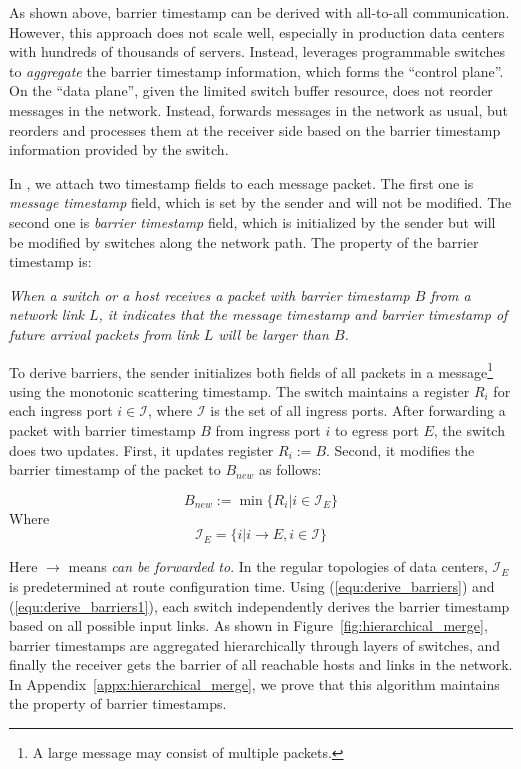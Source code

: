 As shown above, barrier timestamp can be derived with all-to-all communication.
However, this approach does not scale well, especially in production data centers with hundreds of thousands of servers.
Instead, \sys leverages programmable switches to \emph{aggregate} the barrier timestamp information, which forms the ``control plane''.
On the ``data plane'', given the limited switch buffer resource, \sys does not reorder messages in the network.
Instead, \sys forwards messages in the network as usual, but reorders and processes them at the receiver side based on the barrier timestamp information provided by the switch.

In \sys, we attach two timestamp fields to each message packet.
The first one is \textit{message timestamp} field, which is set by the sender and will not be modified. The second one is \textit{barrier timestamp} field, which is initialized by the sender but will be modified by switches along the network path. The property of the barrier timestamp is:

\emph{When a switch or a host receives a packet with barrier timestamp $B$ from a network link $L$, it indicates that the message timestamp and barrier timestamp of future arrival packets from link $L$ will be larger than $B$.}

To derive barriers, the sender initializes both fields of all packets in a message\footnote{A large message may consist of multiple packets.} using the monotonic scattering timestamp. The switch maintains a register $R_i$ for each ingress port $i \in \mathcal{I}$, where $\mathcal{I}$ is the set of all ingress ports.
After forwarding a packet with barrier timestamp $B$ from ingress port $i$ to egress port $E$, the switch does two updates. First, it updates register $R_i := B$. Second, it modifies the barrier timestamp of the packet to $B_{new}$ as follows:

\begin{equation}\label{equ:derive_barriers}
B_{new}:=\min\{R_i| i\in \mathcal{I}_E\}
\end{equation}
Where 
\begin{equation}\label{equ:derive_barriers1}
\mathcal{I}_E =\{i| i\rightarrow E, i \in \mathcal{I} \}
\end{equation}

Here $\rightarrow$ means \textit{can be forwarded to}.
In the regular topologies of data centers, $\mathcal{I}_E$ is predetermined at route configuration time.
Using (\ref{equ:derive_barriers}) and (\ref{equ:derive_barriers1}), each switch independently derives the barrier timestamp based on all possible input links.
As shown in Figure~\ref{fig:hierarchical_merge}, barrier timestamps are aggregated hierarchically through layers of switches, and finally the receiver gets the barrier of all reachable hosts and links in the network.
In Appendix~\ref{appx:hierarchical_merge}, we prove that this algorithm maintains the property of barrier timestamps.

